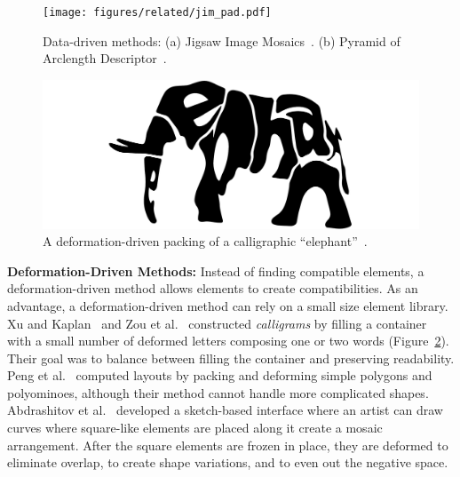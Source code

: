 \begin{figure}
\centering
\texttt{[image: figures/related/jim\_pad.pdf]} 
\caption[Packings generated by JIM and PAD]
{\label{fig_related_jim_pad} 
\newtext
{
Data-driven methods:
(a) Jigsaw Image Mosaics~\cite{Kim2002}.
(b) Pyramid of Arclength Descriptor~\cite{Kwan2016}. 
}
}
\end{figure}




\begin{figure}
\centering
\includegraphics[width=1.0\textwidth]{figures/related/calligraphy.pdf} 
\caption[A calligraphy packing of an ``elephant'']
{\label{fig_calligraphy_packing} 
\newtext
{
A deformation-driven packing of a calligraphic ``elephant''~\cite{Xu2007}.
}
}
\end{figure}


\newtext
{
\textbf{Deformation-Driven Methods:}
Instead of finding compatible elements,
a deformation-driven method allows elements to create compatibilities.
As an advantage, a deformation-driven method can rely on a small size element library.
Xu and Kaplan~\cite{Xu2007} and Zou et al.~\cite{Zou2016}
constructed \textit{calligrams} by filling a container with a small
number of deformed letters composing one or two words (Figure~\ref{fig_calligraphy_packing}).  
Their goal was to balance between filling the container and preserving readability.
Peng et al.~\cite{Peng2014} computed layouts by packing and deforming
simple polygons and polyominoes, although their method cannot handle more
complicated shapes.
Abdrashitov et al.~\cite{Abdrashitov2014} developed
a sketch-based interface where an artist can draw curves where square-like elements are placed along it
create a mosaic arrangement.
After the square elements are frozen in place, 
they are deformed to eliminate overlap, to create shape variations, 
and to even out the negative space.  
}




